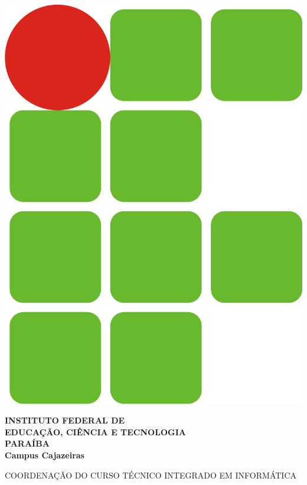 \documentclass[a4paper, 12pt]{letter}
\begin{document}
\hspace{1.4cm}
\begin{minipage}{.19\textwidth}
    \includegraphics[width=.99\textwidth]{images/if}
\end{minipage}
\begin{minipage}[t]{\textwidth}
        \vspace{.001cm}
        {\bf
            {\selectfont
                INSTITUTO FEDERAL DE\\
                EDUCAÇÃO, CIÊNCIA E TECNOLOGIA\\
                {\color{green}
                    PARAÍBA\\
                    Campus Cajazeiras
                }
            }
        }
\end{minipage}
{\bf
{\selectfont
    \begin{center}
        {\selectfont
            COORDENAÇÃO DO CURSO TÉCNICO INTEGRADO EM INFORMÁTICA
        }
    \end{center}
}
}
\end{document}
